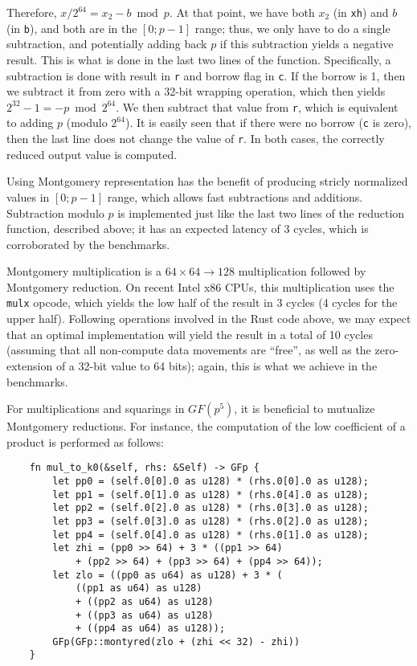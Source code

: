 \documentclass{llncs}
\newcommand{\GF}{GF}
\begin{document}
\begin{itemize}
    Therefore, $x/2^{64} = x_2 - b \bmod p$. At that point, we have both
    $x_2$ (in \verb+xh+) and $b$ (in \verb+b+), and both are in the
    $[0;p-1]$ range; thus, we only have to do a single subtraction, and
    potentially adding back $p$ if this subtraction yields a negative
    result. This is what is done in the last two lines of the function.
    Specifically, a subtraction is done with result in \verb+r+ and
    borrow flag in \verb+c+. If the borrow is 1, then we subtract it
    from zero with a 32-bit wrapping operation, which then yields
    $2^{32}-1 = -p \bmod 2^{64}$. We then subtract that value from
    \verb+r+, which is equivalent to adding $p$ (modulo $2^{64}$). It is
    easily seen that if there were no borrow (\verb+c+ is zero), then
    the last line does not change the value of \verb+r+. In both cases,
    the correctly reduced output value is computed.

\end{itemize}

Using Montgomery representation has the benefit of producing stricly
normalized values in $[0;p-1]$ range, which allows fast subtractions and
additions. Subtraction modulo $p$ is implemented just like the last two
lines of the reduction function, described above; it has an expected
latency of 3 cycles, which is corroborated by the benchmarks.

Montgomery multiplication is a $64\times 64\rightarrow 128$
multiplication followed by Montgomery reduction. On recent Intel x86
CPUs, this multiplication uses the \verb+mulx+ opcode, which yields the
low half of the result in 3 cycles (4 cycles for the upper half).
Following operations involved in the Rust code above, we may expect that
an optimal implementation will yield the result in a total of 10 cycles
(assuming that all non-compute data movements are ``free'', as well as
the zero-extension of a 32-bit value to 64 bits); again, this is what we
achieve in the benchmarks.

For multiplications and squarings in $\GF(p^5)$, it is beneficial to
mutualize Montgomery reductions. For instance, the computation of the
low coefficient of a product is performed as follows:
\begin{verbatim}
    fn mul_to_k0(&self, rhs: &Self) -> GFp {
        let pp0 = (self.0[0].0 as u128) * (rhs.0[0].0 as u128);
        let pp1 = (self.0[1].0 as u128) * (rhs.0[4].0 as u128);
        let pp2 = (self.0[2].0 as u128) * (rhs.0[3].0 as u128);
        let pp3 = (self.0[3].0 as u128) * (rhs.0[2].0 as u128);
        let pp4 = (self.0[4].0 as u128) * (rhs.0[1].0 as u128);
        let zhi = (pp0 >> 64) + 3 * ((pp1 >> 64)
            + (pp2 >> 64) + (pp3 >> 64) + (pp4 >> 64));
        let zlo = ((pp0 as u64) as u128) + 3 * (
            ((pp1 as u64) as u128)
            + ((pp2 as u64) as u128)
            + ((pp3 as u64) as u128)
            + ((pp4 as u64) as u128));
        GFp(GFp::montyred(zlo + (zhi << 32) - zhi))
    }
\end{verbatim}
\end{document}
